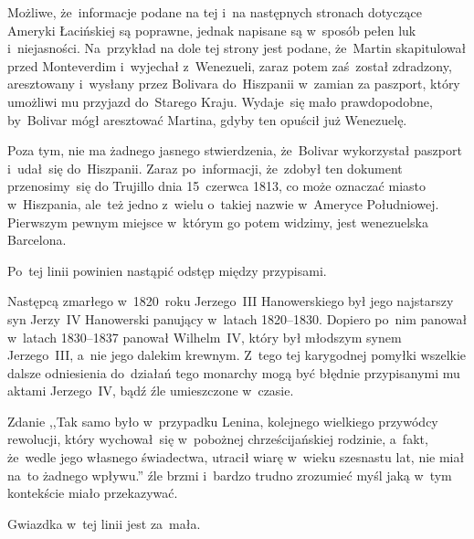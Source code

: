 \documentclass[a4paper,11pt]{article}
\begin{document}
\vspace{\spaceFour}


\start {} Możliwe, że~informacje podane na tej i~na następnych
stronach dotyczące Ameryki Łacińskiej są poprawne, jednak napisane są
w~sposób pełen luk i~niejasności. Na~przykład na dole tej strony jest
podane, że~Martin skapitulował przed Monteverdim i~wyjechał
z~Wenezueli, zaraz potem zaś~został zdradzony, aresztowany i~wysłany
przez Bolivara do~Hiszpanii w~zamian za paszport, który umożliwi mu
przyjazd do~Starego Kraju. Wydaje~się mało prawdopodobne, by~Bolivar
mógł aresztować Martina, gdyby ten opuścił już Wenezuelę.

Poza tym, nie ma żadnego jasnego stwierdzenia, że~Bolivar wykorzystał
paszport i~udał~się do~Hiszpanii. Zaraz po~informacji, że~zdobył ten
dokument przenosimy~się do Trujillo dnia 15~czerwca 1813, co może
oznaczać miasto w~Hiszpania, ale~też jedno z~wielu o~takiej nazwie
w~Ameryce Południowej. Pierwszym pewnym miejsce w~którym go potem
widzimy, jest wenezuelska Barcelona.

\vspace{\spaceFour}


\start {} Po~tej linii powinien nastąpić odstęp między
przypisami.

\vspace{\spaceFour}


\start {} Następcą zmarłego w~1820~roku Jerzego~III
Hanowerskiego był jego najstarszy syn Jerzy~IV Hanowerski panujący
w~latach 1820--1830. Dopiero po~nim panował w~latach 1830--1837
panował Wilhelm~IV, który był młodszym synem Jerzego~III, a~nie jego
dalekim krewnym. Z~tego tej karygodnej pomyłki wszelkie dalsze
odniesienia do~działań tego monarchy mogą być błędnie przypisanymi mu
aktami Jerzego~IV, bądź źle umieszczone w~czasie.

\vspace{\spaceFour}


\start {} Zdanie ,,Tak samo było w~przypadku Lenina,
kolejnego wielkiego przywódcy rewolucji, który wychował~się w~pobożnej
chrześcijańskiej rodzinie, a~fakt, że~wedle jego własnego świadectwa,
utracił wiarę w~wieku szesnastu lat, nie miał na~to żadnego wpływu.''
źle brzmi i~bardzo trudno zrozumieć myśl jaką w~tym kontekście miało
przekazywać.

\vspace{\spaceFour}


\start {} Gwiazdka w~tej linii jest za~mała.
\end{document}
